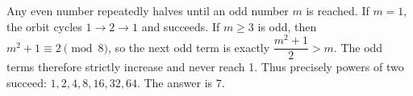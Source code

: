Any even number repeatedly halves until an odd number $m$ is reached. If $m=1$, the orbit cycles $1\to2\to1$ and succeeds. If $m\ge3$ is odd, then $m^2+1\equiv2\pmod8$, so the next odd term is exactly $\dfrac{m^2+1}{2}>m$. The odd terms therefore strictly increase and never reach 1. Thus precisely powers of two succeed: $1,2,4,8,16,32,64$. The answer is $\boxed7$.
